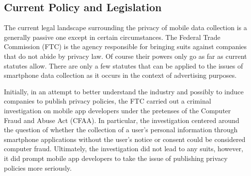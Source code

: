 



	\subsection{Current Policy and Legislation}

The current legal landscape surrounding the privacy of mobile data collection is a generally passive one except in certain circumstances. The Federal Trade Commission (FTC) is the agency responsible for bringing suits against companies that do not abide by privacy law. Of course their powers only go as far as current statutes allow. There are only a few statutes that can be applied to the issues of smartphone data collection as it occurs in the context of advertising purposes. 

Initially, in an attempt to better understand the industry\cite{Wsj2013} and possibly to induce companies to publish privacy policies, the FTC carried out a criminal investigation on mobile app developers under the pretenses of the Computer Fraud and Abuse Act (CFAA). In particular, the investigation centered around the question of whether the collection of a user's personal information through smartphone applications without the user's notice or consent could be considered computer fraud. Ultimately, the investigation did not lead to any suits, however, it did prompt mobile app developers to take the issue of publishing privacy policies more seriously. 

